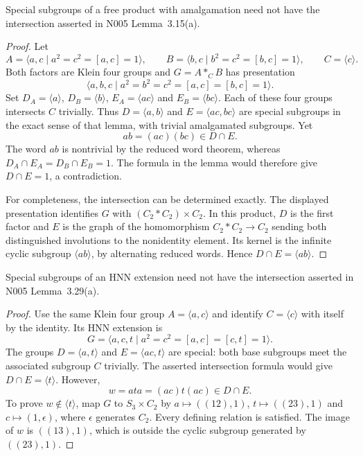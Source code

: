 \begin{proposition}\label{X-prop:amalgam}
Special subgroups of a free product with amalgamation need not have the
intersection asserted in N005 Lemma~3.15(a).
\end{proposition}
\begin{proof}
Let
\[
 A=\langle a,c\mid a^2=c^2=[a,c]=1\rangle,\qquad
 B=\langle b,c\mid b^2=c^2=[b,c]=1\rangle,
 \qquad C=\langle c\rangle.
\]
Both factors are Klein four groups and $G=A*_C B$ has presentation
\[
 \langle a,b,c\mid a^2=b^2=c^2=[a,c]=[b,c]=1\rangle.
\]
Set $D_A=\langle a\rangle$, $D_B=\langle b\rangle$,
$E_A=\langle ac\rangle$ and $E_B=\langle bc\rangle$.
Each of these four groups intersects $C$ trivially. Thus
$D=\langle a,b\rangle$ and $E=\langle ac,bc\rangle$ are special
subgroups in the exact sense of that lemma, with trivial amalgamated
subgroups. Yet
\[
 ab=(ac)(bc)\in D\cap E.
\]
The word $ab$ is nontrivial by the reduced word theorem, whereas
$D_A\cap E_A=D_B\cap E_B=1$. The formula in the lemma would therefore
give $D\cap E=1$, a contradiction.

For completeness, the intersection can be determined exactly. The displayed
presentation identifies $G$ with $(C_2*C_2)\times C_2$. In this product,
$D$ is the first factor and $E$ is the graph of the homomorphism
$C_2*C_2\longrightarrow C_2$ sending both distinguished involutions to
the nonidentity element. Its kernel is the infinite cyclic subgroup
$\langle ab\rangle$, by alternating reduced words. Hence
$D\cap E=\langle ab\rangle$.
\end{proof}

\begin{proposition}\label{X-prop:hnn}
Special subgroups of an HNN extension need not have the intersection
asserted in N005 Lemma~3.29(a).
\end{proposition}
\begin{proof}
Use the same Klein four group $A=\langle a,c\rangle$ and identify
$C=\langle c\rangle$ with itself by the identity. Its HNN extension is
\[
 G=\langle a,c,t\mid a^2=c^2=[a,c]=[c,t]=1\rangle.
\]
The groups $D=\langle a,t\rangle$ and $E=\langle ac,t\rangle$ are
special: both base subgroups meet the associated subgroup $C$ trivially.
The asserted intersection formula would give $D\cap E=\langle t\rangle$.
However,
\[
 w=ata=(ac)t(ac)\in D\cap E.
\]
To prove $w\notin\langle t\rangle$, map $G$ to $S_3\times C_2$ by
$a\mapsto((12),1)$, $t\mapsto((23),1)$ and
$c\mapsto(1,\epsilon)$, where $\epsilon$ generates $C_2$.
Every defining relation is satisfied. The image of $w$ is $((13),1)$,
which is outside the cyclic subgroup generated by $((23),1)$.
\end{proof}

